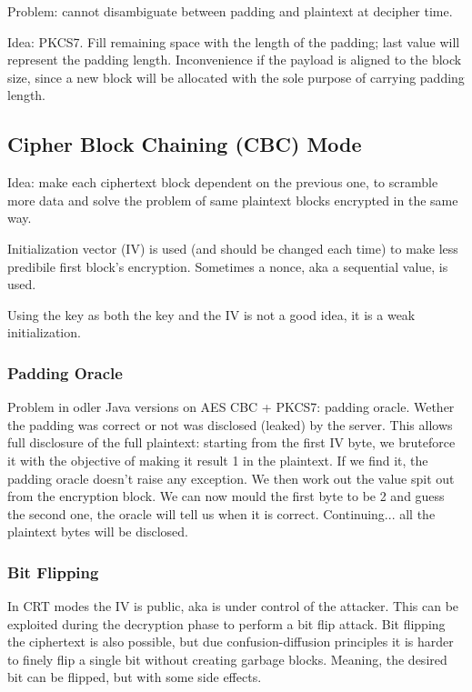 Problem: cannot disambiguate between padding and plaintext at decipher time.

Idea: PKCS7. Fill remaining space with the length of the padding; last value will represent the padding length.
Inconvenience if the payload is aligned to the block size, since a new block will be allocated with the sole purpose of carrying padding length.

\subsection{Cipher Block Chaining (CBC) Mode}
Idea: make each ciphertext block dependent on the previous one, to scramble more data and solve the problem of same plaintext blocks encrypted in the same way.

Initialization vector (IV) is used (and should be changed each time) to make less predibile first block's encryption.
Sometimes a nonce, aka a sequential value, is used.

Using the key as both the key and the IV is not a good idea, it is a weak initialization.

\subsubsection{Padding Oracle}
Problem in odler Java versions on AES CBC + PKCS7: padding oracle.
Wether the padding was correct or not was disclosed (leaked) by the server.
This allows full disclosure of the full plaintext: starting from the first IV byte, we bruteforce it with the objective of making it result 1 in the plaintext.
If we find it, the padding oracle doesn't raise any exception. We then work out the value spit out from the encryption block.
We can now mould the first byte to be 2 and guess the second one, the oracle will tell us when it is correct.
Continuing... all the plaintext bytes will be disclosed.

\subsubsection{Bit Flipping}
In CRT modes the IV is public, aka is under control of the attacker.
This can be exploited during the decryption phase to perform a bit flip attack.
Bit flipping the ciphertext is also possible, but due confusion-diffusion principles it is harder to finely flip a single bit without creating garbage blocks.
Meaning, the desired bit can be flipped, but with some side effects.

